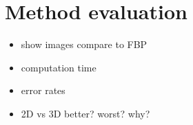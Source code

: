 \chapter{Method evaluation}
\begin{itemize}
	\item show images compare to FBP
	\item computation time
	\item error rates
	\item 2D vs 3D better? worst? why?
\end{itemize}